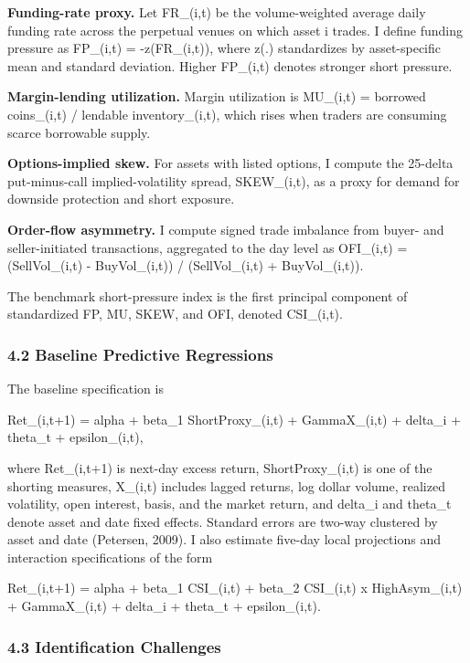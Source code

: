 \documentclass[
]{article}
\begin{document}
\textbf{Funding-rate proxy.} Let FR\_(i,t) be the volume-weighted
average daily funding rate across the perpetual venues on which asset i
trades. I define funding pressure as FP\_(i,t) = -z(FR\_(i,t)), where
z(.) standardizes by asset-specific mean and standard deviation. Higher
FP\_(i,t) denotes stronger short pressure.

\textbf{Margin-lending utilization.} Margin utilization is MU\_(i,t) =
borrowed coins\_(i,t) / lendable inventory\_(i,t), which rises when
traders are consuming scarce borrowable supply.

\textbf{Options-implied skew.} For assets with listed options, I compute
the 25-delta put-minus-call implied-volatility spread, SKEW\_(i,t), as a
proxy for demand for downside protection and short exposure.

\textbf{Order-flow asymmetry.} I compute signed trade imbalance from
buyer- and seller-initiated transactions, aggregated to the day level as
OFI\_(i,t) = (SellVol\_(i,t) - BuyVol\_(i,t)) / (SellVol\_(i,t) +
BuyVol\_(i,t)).

The benchmark short-pressure index is the first principal component of
standardized FP, MU, SKEW, and OFI, denoted CSI\_(i,t).

\subsubsection{4.2 Baseline Predictive
Regressions}\label{42-baseline-predictive-regressions}

The baseline specification is

Ret\_(i,t+1) = alpha + beta\_1 ShortProxy\_(i,t) +
Gamma\textquotesingle X\_(i,t) + delta\_i + theta\_t + epsilon\_(i,t),

where Ret\_(i,t+1) is next-day excess return, ShortProxy\_(i,t) is one
of the shorting measures, X\_(i,t) includes lagged returns, log dollar
volume, realized volatility, open interest, basis, and the market
return, and delta\_i and theta\_t denote asset and date fixed effects.
Standard errors are two-way clustered by asset and date (Petersen,
2009). I also estimate five-day local projections and interaction
specifications of the form

Ret\_(i,t+1) = alpha + beta\_1 CSI\_(i,t) + beta\_2 CSI\_(i,t) x
HighAsym\_(i,t) + Gamma\textquotesingle X\_(i,t) + delta\_i + theta\_t +
epsilon\_(i,t).

\subsubsection{4.3 Identification
Challenges}\label{43-identification-challenges}
\end{document}
